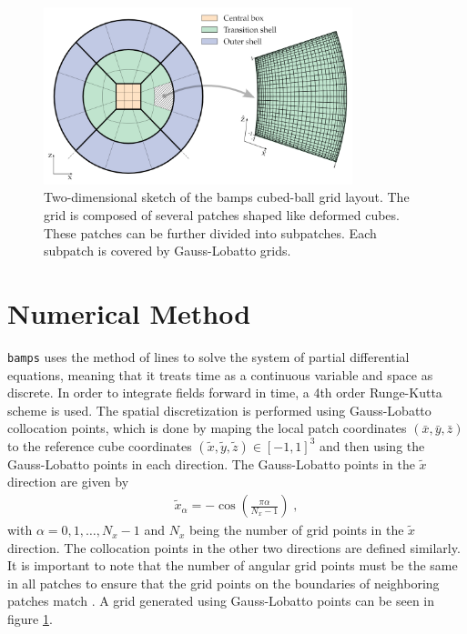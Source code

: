 \begin{figure}[h]
    \centering
    \includegraphics[width=0.8\textwidth]{Figures/Cubed_Ball.png}
    \caption{Two-dimensional sketch of the bamps cubed-ball grid layout. The grid is composed of several patches shaped like deformed cubes. These patches can be further divided into subpatches. Each subpatch is covered by Gauss-Lobatto grids. \cite{Pseudospectral_method_for_gravitational_wave_collapse}}
    \label{fig:cubed_ball_grid}
\end{figure}

\section{Numerical Method}
\label{section:Numerical_Method}

\texttt{bamps} uses the method of lines to solve the system of partial differential equations, meaning that it treats time as a continuous variable and space as discrete. In order to integrate fields forward in time, a 4th order Runge-Kutta scheme is used. The spatial discretization is performed using Gauss-Lobatto collocation points, which is done by maping the local patch coordinates $(\bar{x},\bar{y},\bar{z})$ to the reference cube coordinates $(\tilde{x},\tilde{y},\tilde{z}) \in [-1,1]^3$ and then using the Gauss-Lobatto points in each direction. The Gauss-Lobatto points in the $\tilde{x}$ direction are given by
%
\begin{align}
    \tilde{x}_\alpha = - \cos\left(\frac{\pi \alpha}{N_x -1}\right) \; ,
\end{align}
%
with $\alpha = 0,1,\ldots,N_x -1$ and $N_x$ being the number of grid points in the $\tilde{x}$ direction. The collocation points in the other two directions are defined similarly. It is important to note that the number of angular grid points must be the same in all patches to ensure that the grid points on the boundaries of neighboring patches match \cite{Pseudospectral_method_for_gravitational_wave_collapse}. A grid generated using Gauss-Lobatto points can be seen in figure \ref{fig:cubed_ball_grid}.

